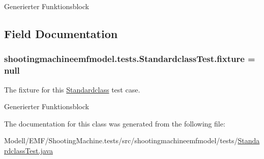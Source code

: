 Generierter Funktionsblock 

\subsection{Field Documentation}
\hypertarget{classshootingmachineemfmodel_1_1tests_1_1_standardclass_test_a24066ba25427e61a0110fc63c2707f24}{
\subsubsection[{fixture}]{ shootingmachineemfmodel.\-tests.\-Standardclass\-Test.\-fixture = null\hspace{0.3cm}{\ttfamily [protected]}}}\label{classshootingmachineemfmodel_1_1tests_1_1_standardclass_test_a24066ba25427e61a0110fc63c2707f24}
The fixture for this \hyperlink{interfaceshootingmachineemfmodel_1_1_standardclass}{Standardclass} test case.

Generierter Funktionsblock 

The documentation for this class was generated from the following file\-:\begin{DoxyCompactItemize}
\item 
Modell/\-E\-M\-F/\-Shooting\-Machine.\-tests/src/shootingmachineemfmodel/tests/\hyperlink{_standardclass_test_8java}{Standardclass\-Test.\-java}\end{DoxyCompactItemize}
